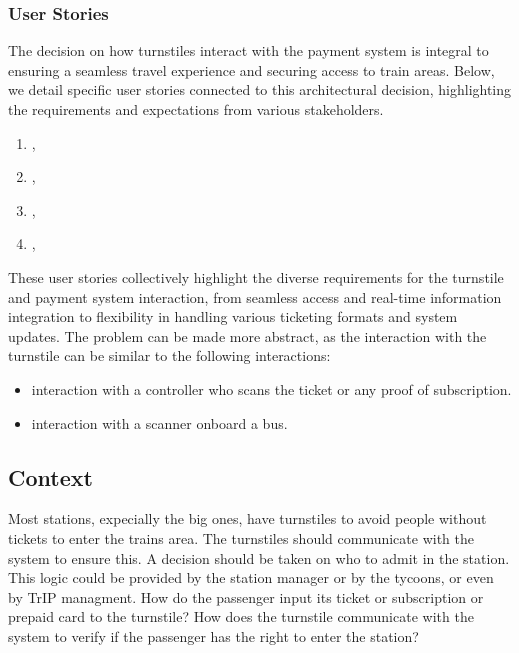 \subsubsection*{User Stories}
The decision on how turnstiles interact with the payment system is integral to ensuring a seamless travel experience and securing access to train areas. Below, we detail specific user stories connected to this architectural decision, highlighting the requirements and expectations from various stakeholders.

\begin{enumerate}[noitemsep]
    \item \userStoryOne,
    \item \userStoryTwentySix,
    \item \userStoryTwentySeven,
    \item \userStoryTwentyThree,
\end{enumerate}

These user stories collectively highlight the diverse requirements for the turnstile and payment system interaction, from seamless access and real-time information integration to flexibility in handling various ticketing formats and system updates.
The problem can be made more abstract, as the interaction with the turnstile can be similar to the following interactions:
\begin{itemize}
    \item interaction with a controller who scans the ticket or any proof of subscription.
    \item interaction with a scanner onboard a bus.
\end{itemize}

\subsection*{Context}

Most stations, expecially the big ones, have turnstiles to avoid people without tickets to enter the trains area.
The turnstiles should communicate with the system to ensure this. A decision should be taken on who to admit in the station.
This logic could be provided by the station manager or by the tycoons, or even by TrIP managment.
How do the passenger input its ticket or subscription or prepaid card to the turnstile?
How does the turnstile communicate with the system to verify if the passenger has the right to enter the station?

